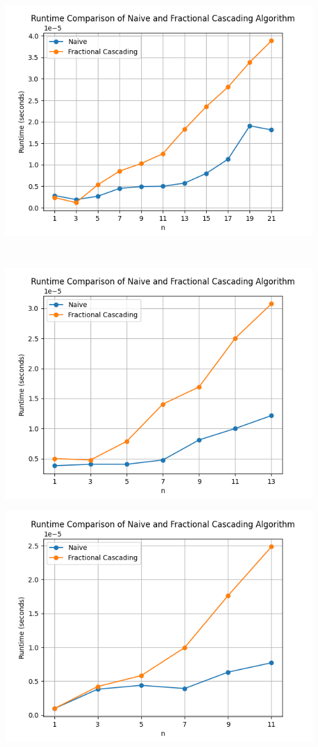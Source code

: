 \documentclass[12pt,english,]{article}
\let\origfigure\figure
\let\endorigfigure\endfigure
\renewenvironment{figure}[1][2] {
    \expandafter\origfigure\expandafter[H]
} {
    \endorigfigure
}
\begin{document}
\begin{figure}

{\centering \includegraphics[width=0.7\linewidth]{images/3_1} 

}

\caption{Running time of path 1 on $d=3$.}\label{fig:graph1}
\end{figure}

~

\begin{figure}

{\centering \includegraphics[width=0.7\linewidth]{images/4_1} 

}

\caption{Running time of path 1 on $d=4$.}\label{fig:graph2}
\end{figure}

\begin{figure}

{\centering \includegraphics[width=0.7\linewidth]{images/5_1} 

}

\caption{Running time of path 1 on $d=5$.}\label{fig:graph3}
\end{figure}
\end{document}
